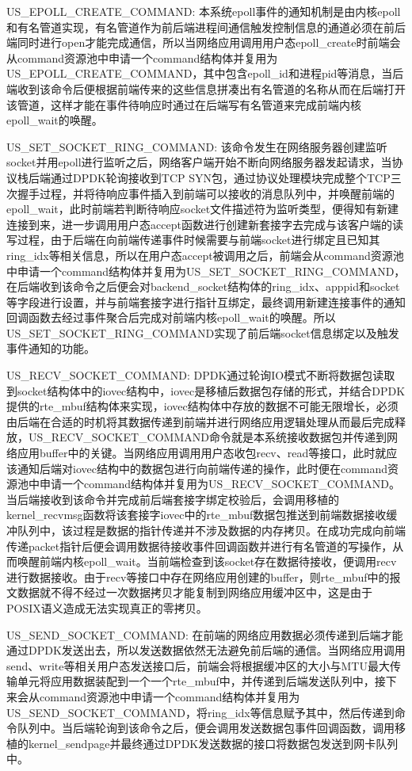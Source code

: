 US\_EPOLL\_CREATE\_COMMAND: 本系统epoll事件的通知机制是由内核epoll和有名管道实现，有名管道作为前后端进程间通信触发控制信息的通道必须在前后端同时进行open才能完成通信，所以当网络应用调用用户态epoll\_create时前端会从command资源池中申请一个command结构体并复用为US\_EPOLL\_CREATE\_COMMAND，其中包含epoll\_id和进程pid等消息，当后端收到该命令后便根据前端传来的这些信息拼凑出有名管道的名称从而在后端打开该管道，这样才能在事件待响应时通过在后端写有名管道来完成前端内核epoll\_wait的唤醒。

US\_SET\_SOCKET\_RING\_COMMAND: 该命令发生在网络服务器创建监听socket并用epoll进行监听之后，网络客户端开始不断向网络服务器发起请求，当协议栈后端通过DPDK轮询接收到TCP SYN包，通过协议处理模块完成整个TCP三次握手过程，并将待响应事件插入到前端可以接收的消息队列中，并唤醒前端的epoll\_wait，此时前端若判断待响应socket文件描述符为监听类型，便得知有新建连接到来，进一步调用用户态accept函数进行创建新套接字去完成与该客户端的读写过程，由于后端在向前端传递事件时候需要与前端socket进行绑定且已知其ring\_idx等相关信息，所以在用户态accept被调用之后，前端会从command资源池中申请一个command结构体并复用为US\_SET\_SOCKET\_RING\_COMMAND，在后端收到该命令之后便会对backend\_socket结构体的ring\_idx、apppid和socket等字段进行设置，并与前端套接字进行指针互绑定，最终调用新建连接事件的通知回调函数去经过事件聚合后完成对前端内核epoll\_wait的唤醒。所以US\_SET\_SOCKET\_RING\_COMMAND实现了前后端socket信息绑定以及触发事件通知的功能。

US\_RECV\_SOCKET\_COMMAND: DPDK通过轮询IO模式不断将数据包读取到socket结构体中的iovec结构中，iovec是移植后数据包存储的形式，并结合DPDK提供的rte\_mbuf结构体来实现，iovec结构体中存放的数据不可能无限增长，必须由后端在合适的时机将其数据传递到前端并进行网络应用逻辑处理从而最后完成释放，US\_RECV\_SOCKET\_COMMAND命令就是本系统接收数据包并传递到网络应用buffer中的关键。当网络应用调用用户态收包recv、read等接口，此时就应该通知后端对iovec结构中的数据包进行向前端传递的操作，此时便在command资源池中申请一个command结构体并复用为US\_RECV\_SOCKET\_COMMAND。当后端接收到该命令并完成前后端套接字绑定校验后，会调用移植的kernel\_recvmsg函数将该套接字iovec中的rte\_mbuf数据包推送到前端数据接收缓冲队列中，该过程是数据的指针传递并不涉及数据的内存拷贝。在成功完成向前端传递packet指针后便会调用数据待接收事件回调函数并进行有名管道的写操作，从而唤醒前端内核epoll\_wait。当前端检查到该socket存在数据待接收，便调用recv进行数据接收。由于recv等接口中存在网络应用创建的buffer，则rte\_mbuf中的报文数据就不得不经过一次数据拷贝才能复制到网络应用缓冲区中，这是由于POSIX语义造成无法实现真正的零拷贝。


US\_SEND\_SOCKET\_COMMAND: 在前端的网络应用数据必须传递到后端才能通过DPDK发送出去，所以发送数据依然无法避免前后端的通信。当网络应用调用send、write等相关用户态发送接口后，前端会将根据缓冲区的大小与MTU最大传输单元将应用数据装配到一个一个rte\_mbuf中，并传递到后端发送队列中，接下来会从command资源池中申请一个command结构体并复用为US\_SEND\_SOCKET\_COMMAND，将ring\_idx等信息赋予其中，然后传递到命令队列中。当后端轮询到该命令之后，便会调用发送数据包事件回调函数，调用移植的kernel\_sendpage并最终通过DPDK发送数据的接口将数据包发送到网卡队列中。

